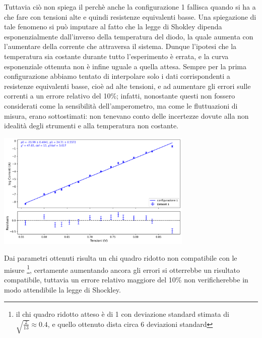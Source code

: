 \documentclass[a4paper]{article}
\begin{document}
Tuttavia ciò non spiega il perchè anche la configurazione 1 fallisca quando si ha a che fare con tensioni alte e quindi resistenze equivalenti basse.
Una spiegazione di tale fenomeno si può imputare al fatto che la legge di Shokley dipenda esponenzialmente dall'inverso della temperatura del diodo, la quale aumenta con l'aumentare della corrente che attraversa il sistema. Dunque l'ipotesi che la temperatura sia costante durante tutto l'esperimento è errata, e la curva esponenziale ottenuta non è infine uguale a quella attesa. Sempre per la prima configurazione abbiamo tentato di interpolare solo i dati corrispondenti a resistenze equivalenti basse, cioè ad alte tensioni, e ad aumentare gli errori sulle correnti a un errore relativo del 10\%; infatti, nonostante questi non fossero considerati come la sensibilità dell'amperometro, ma come le fluttuazioni di misura, erano sottostimati: non tenevano conto delle incertezze dovute alla non idealità degli strumenti e alla temperatura non costante.

\begin{center}
    \includegraphics[width=0.7\textwidth]{grafici/diodo_sad.png}
\end{center}
Dai parametri ottenuti risulta un chi quadro ridotto non compatibile con le misure \footnote{il chi quadro ridotto atteso è di 1 con deviazione standard stimata di $\sqrt{\frac{2}{13}} \approx 0.4$, e quello ottenuto dista circa 6 deviazioni standard}, certamente aumentando ancora gli errori si otterrebbe un risultato compatibile, tuttavia un errore relativo maggiore del 10\% non verificherebbe in modo attendibile la legge di Shockley.
\end{document}

